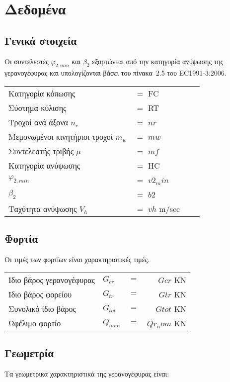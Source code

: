 \section{Δεδομένα}
\subsection{Γενικά στοιχεία}

Οι συντελεστές $φ_{2,min}$ και $β_2$ εξαρτώνται από την κατηγορία ανύψωσης της γερανογέφυρας και
υπολογίζονται βάσει του πίνακα~2.5 του EC1991-3:2006.

\begin{tabular}{llcr}
    Κατηγορία κόπωσης                   &$=$ {{ FC }} \\
    Σύστημα κύλισης                     &$=$ {{ RT }}\\
    Τροχοί ανά άξονα    $n_r$           &$=$ ${{ nr }} $ \\
    Μεμονωμένοι κινητήριοι τροχοί $m_w$ &$=$ ${{ mw }}$ \\
    Συντελεστής τριβής $\mu$            &$=$ ${{ mf }}$ \\
    Κατηγορία ανύψωσης                  &$=$ {{ HC }} \\
    $φ_{2,min}$                         &$=$ ${{ v2_min }}$ \\
    $β_2$                               &$=$ ${{ b2 }}$ \\
    Ταχύτητα ανύψωσης  $V_h$            &$=$ ${{ vh }}$ m/sec
\end{tabular}

\subsection{Φορτία}
Οι τιμές των φορτίων είναι χαρακτηριστικές τιμές.

\begin{tabular}{llcr}
    Ίδιο βάρος γερανογέφυρας     & $G_{cr}$  &$=$ &${{ Gcr }}$ KN \\
    Ίδιο βάρος φορείου           & $G_{tr}$  &$=$ &${{ Gtr }}$ KN \\
    Συνολικό ίδιο βάρος          & $G_{tot}$ &$=$ &${{ Gtot }}$ KN \\
    Ωφέλιμο φορτίο               & $Q_{nom}$ &$=$ &${{ Qr_nom }}$ KN
\end{tabular}

\subsection{Γεωμετρία}
Τα γεωμετρικά χαρακτηριστικά της γερανογέφυρας είναι:


